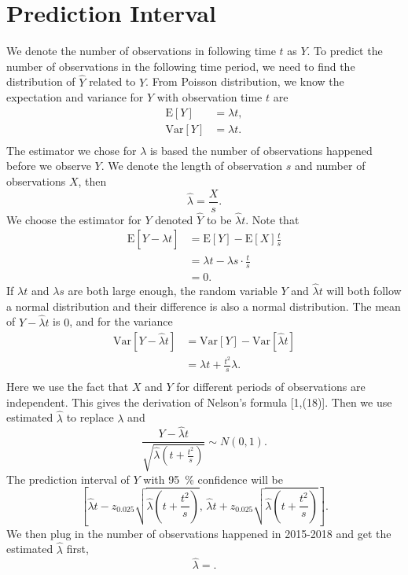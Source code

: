 \documentclass[11pt,a4paper,english]{article}
\begin{document}
\section{Prediction Interval}
We denote the number of observations in following time $t$ as $Y$.
To predict the number of observations in the following time period, we need to find the distribution of $\hat{Y}$ related to $Y$. 
From Poisson distribution, we know the expectation and variance for $Y$ with observation time $t$ are
\begin{align*}
	\text{E}[Y] &= \lambda t,\\
	\text{Var}[Y] &= \lambda t.\\
\end{align*}
The estimator we chose for $\lambda$ is based the number of observations happened before we observe $Y$.
We denote the length of observation $s$ and number of observations $X$, then
\begin{equation*}
	\hat{\lambda} = \frac{X}{s}.
\end{equation*}
We choose the estimator for $Y$ denoted $\hat{Y}$ to be $\hat{\lambda}t$.
Note that
\begin{align*}
	\text{E}[Y-\hat{\lambda}t] &= \text{E}[Y]-\text{E}[X]\frac{t}{s}\\
	&= \lambda t-\lambda s \cdot \frac{t}{s}\\
	&= 0.
\end{align*}
If $\lambda t$ and $\lambda s$ are both large enough, the random variable $Y$ and $\hat{\lambda}t$ will both follow a normal distribution and their difference is also a normal distribution.
The mean of $Y-\hat{\lambda}t$ is $0$, and for the variance
\begin{align*}
	\text{Var}[Y-\hat{\lambda}t] &= \text{Var}[Y]-\text{Var}[\hat{\lambda}t]\\
	&= \lambda t+\frac{t^{2}}{s}\lambda.\\
\end{align*}
Here we use the fact that $X$ and $Y$ for different periods of observations are independent.
This gives the derivation of Nelson's formula [1,(18)].
Then we use estimated $\hat{\lambda}$ to replace $\lambda$ and 
\begin{equation*}
	\frac{Y-\hat{\lambda}t}{\sqrt{\hat{\lambda}\left(t+\frac{t^{2}}{s}\right)}} \sim N(0,1).
\end{equation*}
The prediction interval of $Y$ with \SI{95}{\percent} confidence will be 
\begin{equation*}
	\left[
	\hat{\lambda}t-z_{0.025}\sqrt{\hat{\lambda}\left(t+\frac{t^{2}}{s}\right)},
	\,
	\hat{\lambda}t+z_{0.025}\sqrt{\hat{\lambda}\left(t+\frac{t^{2}}{s}\right)}
	\right].
\end{equation*}
We then plug in the number of observations happened in 2015-2018 and get the estimated $\hat{\lambda}$ first,
\[\hat{\lambda} = .\]
\end{document}
